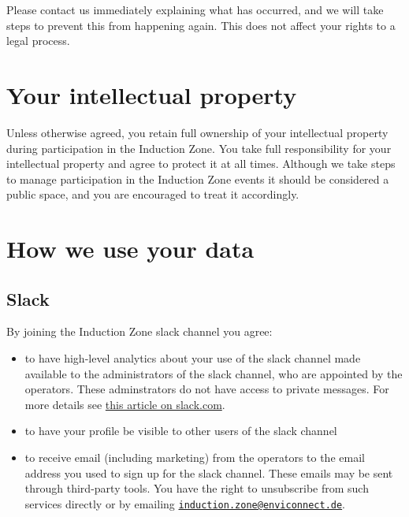 \documentclass[
  10pt,
  a4paper,
]{article}
\providecommand{\tightlist}{%
  \setlength{\itemsep}{0pt}\setlength{\parskip}{0pt}}
\begin{document}
Please contact us immediately explaining what has occurred, and we will
take steps to prevent this from happening again. This does not affect
your rights to a legal process.

\hypertarget{your-intellectual-property}{%
\section{Your intellectual property}\label{your-intellectual-property}}

Unless otherwise agreed, you retain full ownership of your intellectual
property during participation in the Induction Zone. You take full
responsibility for your intellectual property and agree to protect it at
all times. Although we take steps to manage participation in the
Induction Zone events it should be considered a public space, and you
are encouraged to treat it accordingly.

\hypertarget{how-we-use-your-data}{%
\section{How we use your data}\label{how-we-use-your-data}}

\hypertarget{slack}{%
\subsection{Slack}\label{slack}}

By joining the Induction Zone slack channel you agree:

\begin{itemize}
\tightlist
\item
  to have high-level analytics about your use of the slack channel made
  available to the administrators of the slack channel, who are
  appointed by the operators. These adminstrators do not have access to
  private messages. For more details see
  \href{https://slack.com/help/articles/360047512554-Use-channel-management-tools}{this
  article on slack.com}.
\item
  to have your profile be visible to other users of the slack channel
\item
  to receive email (including marketing) from the operators to the email
  address you used to sign up for the slack channel. These emails may be
  sent through third-party tools. You have the right to unsubscribe from
  such services directly or by emailing
  \href{mailto:induction.zone@enviconnect.de}{\nolinkurl{induction.zone@enviconnect.de}}.
\end{itemize}
\end{document}
